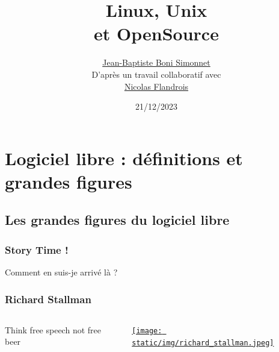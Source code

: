\documentclass{beamer}
\title{Linux, Unix\\ et OpenSource}
\date{21/12/2023}
\author[JB Boni Simonnet]{\href{https://github.com/Odonon}{Jean-Baptiste Boni Simonnet}\\D'après un travail collaboratif avec\\ \href{https://github.com/NicolasFlandrois}{Nicolas Flandrois}}
\begin{document}
\begin{frame}[plain]
\titlepage
\end{frame}




\section[Logiciel libre]{Logiciel libre : définitions et grandes figures}

\subsection{Les grandes figures du logiciel libre}
\begin{frame} 
\frametitle{Story Time !} 

\begin{center}
	Comment en suis-je arrivé là ?

\end{center}

\end{frame}

\begin{frame}
	\frametitle{Richard Stallman}
	
\begin{columns}
	\begin{column}{.5\textwidth}
		Think free speech not free beer
	\end{column}
	
	
	\begin{column}{.5\textwidth}
		\href{https://fr.wikipedia.org/wiki/Richard_Stallman}{\texttt{[image: static/img/richard\_stallman.jpeg]}}
	\end{column}
\end{columns}
\end{frame}
\end{document}
